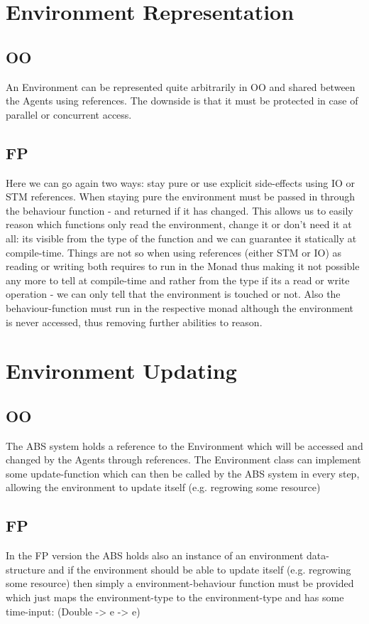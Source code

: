 \section{Environment Representation}
\subsection{OO}
An Environment can be represented quite arbitrarily in OO and shared between the Agents using references. The downside is that it must be protected in case of parallel or concurrent access.
\subsection{FP}
Here we can go again two ways: stay pure or use explicit side-effects using IO or STM references. When staying pure the environment must be passed in through the behaviour function - and returned if it has changed. This allows us to easily reason which functions only read the environment, change it or don't need it at all: its visible from the type of the function and we can guarantee it statically at compile-time.
Things are not so when using references (either STM or IO) as reading or writing both requires to run in the Monad thus making it not possible any more to tell at compile-time and rather from the type if its a read or write operation - we can only tell that the environment is touched or not. Also the behaviour-function must run in the respective monad although the environment is never accessed, thus removing further abilities to reason.

\section{Environment Updating}
\subsection{OO}
The ABS system holds a reference to the Environment which will be accessed and changed by the Agents through references. The Environment class can implement some update-function which can then be called by the ABS system in every step, allowing the environment to update itself (e.g. regrowing some resource)
\subsection{FP}
In the FP version the ABS holds also an instance of an environment data-structure and if the environment should be able to update itself (e.g. regrowing some resource) then simply a environment-behaviour function must be provided which just maps the environment-type to the environment-type and has some time-input: (Double -> e -> e)

